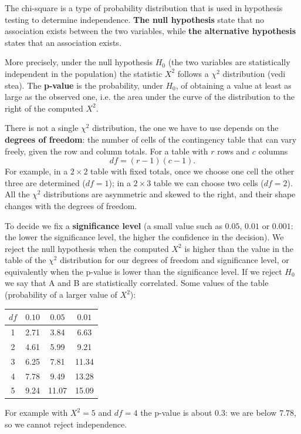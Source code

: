The chi-square is a type of probability distribution that is used in hypothesis testing to determine independence. \textbf{The null hypothesis} state that no association exists between the two variables, while \textbf{the alternative hypothesis} states that an association exists.

More precisely, under the null hypothesis $H_0$ (the two variables are statistically independent in the population) the statistic $X^2$ follows a $\chi^2$ distribution (vedi stea). The \textbf{p-value} is the probability, under $H_0$, of obtaining a value at least as large as the observed one, i.e. the area under the curve of the distribution to the right of the computed $X^2$.

There is not a single $\chi^2$ distribution, the one we have to use depends on the \textbf{degrees of freedom}: the number of cells of the contingency table that can vary freely, given the row and column totals. For a table with $r$ rows and $c$ columns
\[
    df=(r-1)(c-1).
\]
For example, in a $2\times 2$ table with fixed totals, once we choose one cell the other three are determined ($df=1$); in a $2\times 3$ table we can choose two cells ($df=2$). All the $\chi^2$ distributions are asymmetric and skewed to the right, and their shape changes with the degrees of freedom.

To decide we fix a \textbf{significance level} (a small value such as $0.05$, $0.01$ or $0.001$: the lower the significance level, the higher the confidence in the decision). We reject the null hypothesis when the computed $X^2$ is higher than the value in the table of the $\chi^2$ distribution for our degrees of freedom and significance level, or equivalently when the p-value is lower than the significance level. If we reject $H_0$ we say that A and B are statistically correlated. Some values of the table (probability of a larger value of $X^2$):
\begin{center}
\begin{tabular}{cccc}
\toprule
$df$ & $0.10$ & $0.05$ & $0.01$ \\
\midrule
1 & 2.71 & 3.84 & 6.63 \\
2 & 4.61 & 5.99 & 9.21 \\
3 & 6.25 & 7.81 & 11.34 \\
4 & 7.78 & 9.49 & 13.28 \\
5 & 9.24 & 11.07 & 15.09 \\
\bottomrule
\end{tabular}
\end{center}
For example with $X^2=5$ and $df=4$ the p-value is about $0.3$: we are below $7.78$, so we cannot reject independence.

